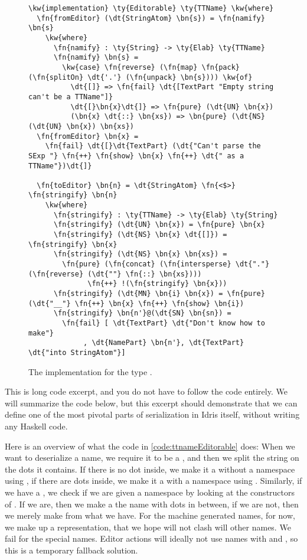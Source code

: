 \begin{figure}[ht]
\caption{The  implementation for the type .}
\label{code:ttnameEditorable}
\begin{Verbatim}[framesep=2mm, label=\footnotesize{\normalfont{Idris}}, labelposition=topline]
\kw{implementation} \ty{Editorable} \ty{TTName} \kw{where}
  \fn{fromEditor} (\dt{StringAtom} \bn{s}) = \fn{namify} \bn{s}
    \kw{where}
      \fn{namify} : \ty{String} -> \ty{Elab} \ty{TTName}
      \fn{namify} \bn{s} =
        \kw{case} \fn{reverse} (\fn{map} \fn{pack} (\fn{splitOn} \dt{'.'} (\fn{unpack} \bn{s}))) \kw{of}
          \dt{[]} => \fn{fail} \dt{[TextPart "Empty string can't be a TTName"]}
          \dt{[}\bn{x}\dt{]} => \fn{pure} (\dt{UN} \bn{x})
          (\bn{x} \dt{::} \bn{xs}) => \bn{pure} (\dt{NS} (\dt{UN} \bn{x}) \bn{xs})
  \fn{fromEditor} \bn{x} =
    \fn{fail} \dt{[}\dt{TextPart} (\dt{"Can't parse the SExp "} \fn{++} \fn{show} \bn{x} \fn{++} \dt{" as a TTName"})\dt{]}

  \fn{toEditor} \bn{n} = \dt{StringAtom} \fn{<$>} \fn{stringify} \bn{n}
    \kw{where}
      \fn{stringify} : \ty{TTName} -> \ty{Elab} \ty{String}
      \fn{stringify} (\dt{UN} \bn{x}) = \fn{pure} \bn{x}
      \fn{stringify} (\dt{NS} \bn{x} \dt{[]}) = \fn{stringify} \bn{x}
      \fn{stringify} (\dt{NS} \bn{x} \bn{xs}) =
        \fn{pure} (\fn{concat} (\fn{intersperse} \dt{"."} (\fn{reverse} (\dt{""} \fn{::} \bn{xs})))
              \fn{++} !(\fn{stringify} \bn{x}))
      \fn{stringify} (\dt{MN} \bn{i} \bn{x}) = \fn{pure} (\dt{"__"} \fn{++} \bn{x} \fn{++} \fn{show} \bn{i})
      \fn{stringify} \bn{n'}@(\dt{SN} \bn{sn}) =
        \fn{fail} [ \dt{TextPart} \dt{"Don't know how to make"}
             , \dt{NamePart} \bn{n'}, \dt{TextPart} \dt{"into StringAtom"}]
\end{Verbatim}
\end{figure}

This is long code excerpt, and you do not have to follow the code entirely.
We will summarize the code below, but this excerpt should demonstrate that
we can define one of the most pivotal parts of serialization in Idris itself,
without writing any Haskell code.

Here is an overview of what the code in \autoref{code:ttnameEditorable} does:
When we want to deserialize a name, we require it to be a , and
then we split the string  on the dots it contains. If there is no dot
inside, we make it a  without a namespace using , if there
are dots inside, we make it a  with a namespace using .
Similarly, if we have a , we check if we are given a namespace by
looking at the constructors of . If we are, then we make a
 the name with dots in between, if we are not, then we merely make
 from what we have.
For the machine generated names, for now, we make up a representation, that we
hope will not clash will other names.
We fail for the special names. Editor actions will ideally not use names with
 and , so this is a temporary fallback solution.

